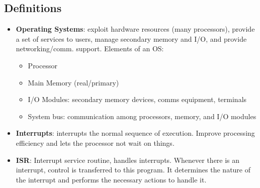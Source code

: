 \documentclass[fontsize=5pt]{scrartcl}
\begin{document}
\begin{multicols}{3}
  \section{Definitions}
    \begin{itemize}
      \item \textbf{Operating Systems}: exploit hardware resources (many processors), provide a set of services to users, manage secondary memory and I/O, %
          and provide networking/comm. support. Elements of an OS:
      \begin{itemize}
        \item Processor
        \item Main Memory (real/primary)
        \item I/O Modules: secondary memory devices, comms equipment, terminals
        \item System bus: communication among processors, memory, and I/O modules
       \end{itemize}
       \item \textbf{Interrupts}: interrupts the normal sequence of execution. Improve processing efficiency and lets the processor not wait on things.
       \item \textbf{ISR}: Interrupt service routine, handles interrupts. Whenever  there is an interrupt, control is transferred to this program.  %
                       It determines the nature of the interrupt and performs the necessary actions to handle it.

    \end{itemize}

\end{multicols}
\end{document}
